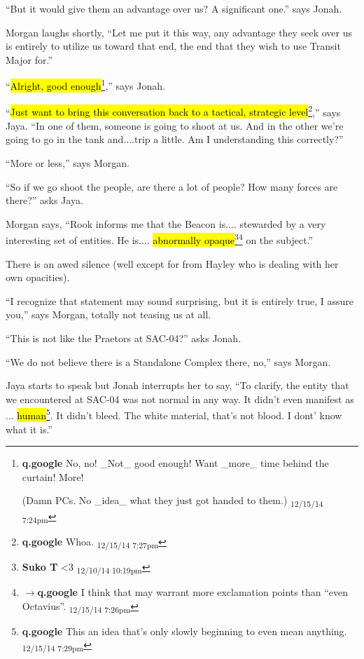 ``But it would give them an advantage over us?  A significant one.'' says Jonah.

Morgan laughs shortly, ``Let me put it this way, any advantage they seek over us is entirely to utilize us toward that end, the end that they wish to use Transit Major for.''

``\hl{Alright, good enough}\footnote{\textbf{q.google }No, no!  \_Not\_ good enough!  Want \_more\_ time behind the curtain!  More!

(Damn PCs.  No \_idea\_ what they just got handed to them.) \textsubscript{12/15/14 7:24pm}},'' says Jonah.



``\hl{Just want to bring this conversation back to a tactical, strategic level}\footnote{\textbf{q.google }Whoa. \textsubscript{12/15/14 7:27pm}},'' says Jaya. ``In one of them, someone is going to shoot at us.  And in the other we're going to go in the tank and....trip a little.  Am I understanding this correctly?''

``More or less,'' says Morgan.

``So if we go shoot the people, are there a lot of people?  How many forces are there?'' asks Jaya.

Morgan says, ``Rook informs me that the Beacon is.... stewarded by a very interesting set of entities.  He is.... \hl{abnormally opaque}\footnote{\textbf{Suko T }\textless 3 \textsubscript{12/10/14 10:19pm}}\footnote{$\rightarrow$\textbf{q.google }I think that may warrant more exclamation points than ``even Octavius''. \textsubscript{12/15/14 7:26pm}} on the subject.''

There is an awed silence (well except for from Hayley who is dealing with her own opacities).

``I recognize that statement may sound surprising, but it is entirely true, I assure you,'' says Morgan, totally not teasing us at all.

``This is not like the Praetors at SAC-04?'' asks Jonah.

``We do not believe there is a Standalone Complex there, no,'' says Morgan.

Jaya starts to speak but Jonah interrupts her to say, ``To clarify, the entity that we encountered at SAC-04 was not normal in any way.  It didn't even manifest as ... \hl{human}\footnote{\textbf{q.google }This an idea that's only slowly beginning to even mean anything. \textsubscript{12/15/14 7:29pm}}.  It didn't bleed.  The white material, that's not blood. I dont' know what it is.''

